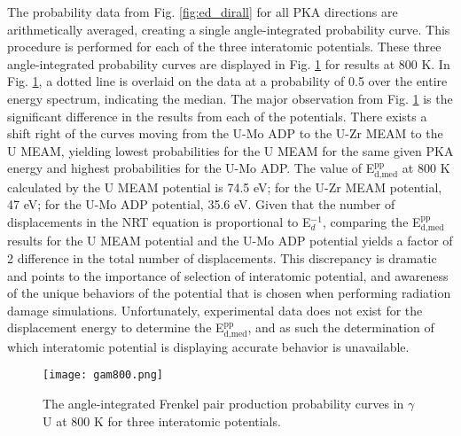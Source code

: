 \documentclass[review]{elsarticle}
\begin{document}
The probability data from Fig. \ref{fig:ed_dirall} for all PKA directions are arithmetically averaged, creating a single angle-integrated probability curve. This procedure is performed for each of the three interatomic potentials. These three angle-integrated probability curves are displayed in Fig. \ref{fig:gam800} for results at 800 K. In Fig. \ref{fig:gam800}, a dotted line is overlaid on the data at a probability of 0.5 over the entire energy spectrum, indicating the median. The major observation from Fig. \ref{fig:gam800} is the significant difference in the results from each of the potentials. There exists a shift right of the curves moving from the U-Mo ADP to the U-Zr MEAM to the U MEAM, yielding lowest probabilities for the U MEAM for the same given PKA energy and highest probabilities for the U-Mo ADP. The value of E$^{\textrm{pp}}_{\textrm{d,med}}$ at 800 K calculated by the U MEAM potential is 74.5 eV; for the U-Zr MEAM potential, 47 eV; for the U-Mo ADP potential, 35.6 eV. Given that the number of displacements in the NRT equation \cite{norgett1975} is proportional to E$_{d}^{-1}$, comparing the E$^{\textrm{pp}}_{\textrm{d,med}}$ results for the U MEAM potential and the U-Mo ADP potential yields a factor of 2 difference in the total number of displacements. This discrepancy is dramatic and points to the importance of selection of interatomic potential, and awareness of the unique behaviors of the potential that is chosen when performing radiation damage simulations. Unfortunately, experimental data does not exist for the displacement energy to determine the E$^{\textrm{pp}}_{\textrm{d,med}}$, and as such the determination of which interatomic potential is displaying accurate behavior is unavailable. 

\begin{figure}[h]
 \centering
 \texttt{[image: gam800.png]} 
 \caption{The angle-integrated Frenkel pair production probability curves in $\gamma$U at 800 K for three interatomic potentials.}
 \label{fig:gam800}
\end{figure}



\FloatBarrier
\end{document}

